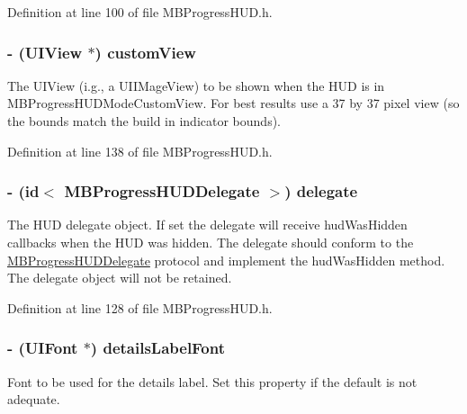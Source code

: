 Definition at line 100 of file MBProgressHUD.h.

\hypertarget{interface_m_b_progress_h_u_d_a3a6f62a10481ff864c43768214335413}{
\subsubsection[{customView}]{\setlength{\rightskip}{0pt plus 5cm}-\/ (UIView $\ast$) customView}}
\label{interface_m_b_progress_h_u_d_a3a6f62a10481ff864c43768214335413}
The UIView (i.g., a UIIMageView) to be shown when the HUD is in MBProgressHUDModeCustomView. For best results use a 37 by 37 pixel view (so the bounds match the build in indicator bounds). 

Definition at line 138 of file MBProgressHUD.h.

\hypertarget{interface_m_b_progress_h_u_d_a11525953bb5a88c09134de82a59bac22}{
\subsubsection[{delegate}]{\setlength{\rightskip}{0pt plus 5cm}-\/ (id$<$ {\bf MBProgressHUDDelegate} $>$) delegate}}
\label{interface_m_b_progress_h_u_d_a11525953bb5a88c09134de82a59bac22}
The HUD delegate object. If set the delegate will receive hudWasHidden callbacks when the HUD was hidden. The delegate should conform to the \hyperlink{protocol_m_b_progress_h_u_d_delegate-p}{MBProgressHUDDelegate} protocol and implement the hudWasHidden method. The delegate object will not be retained. 

Definition at line 128 of file MBProgressHUD.h.

\hypertarget{interface_m_b_progress_h_u_d_af64b9ad0a4e509b96b9ffefc6f379b53}{
\subsubsection[{detailsLabelFont}]{\setlength{\rightskip}{0pt plus 5cm}-\/ (UIFont $\ast$) detailsLabelFont}}
\label{interface_m_b_progress_h_u_d_af64b9ad0a4e509b96b9ffefc6f379b53}
Font to be used for the details label. Set this property if the default is not adequate. 

